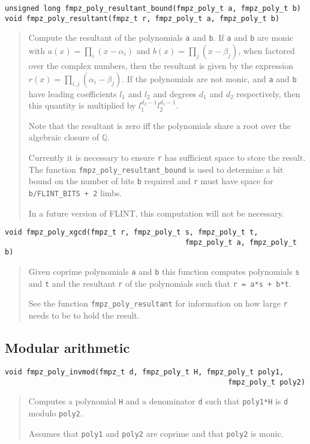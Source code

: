 \documentclass[a4paper,10pt]{article}
\newcommand{\Q}{\mathbb{Q}}
\newcommand{\code}{\lstinline}
\begin{document}
\begin{lstlisting}
unsigned long fmpz_poly_resultant_bound(fmpz_poly_t a, fmpz_poly_t b)
void fmpz_poly_resultant(fmpz_t r, fmpz_poly_t a, fmpz_poly_t b)
\end{lstlisting}
\begin{quote}
Compute the resultant of the polynomials \code{a} and \code{b}. If \code{a} and \code{b} are monic with $a(x) = \prod_i (x - \alpha_i)$ and $b(x) = \prod_j (x - \beta_j)$, when factored over the complex numbers, then the resultant is given by the expression $r(x) = \prod_{i,j} (\alpha_i - \beta_j)$. If the polynomials are not monic, and \code{a} and \code{b} have leading coefficients $l_1$ and $l_2$ and degrees $d_1$ and $d_2$ respectively, then this quantity is multiplied by $l_1^{d_2-1}l_2^{d_1-1}$.

Note that the resultant is zero iff the polynomials share a root over the algebraic closure of $\Q$.

Currently it is necessary to ensure \code{r} has sufficient space to store the result. The function \code{fmpz_poly_resultant_bound} is used to determine a bit bound on the number of bits \code{b} required and \code{r} must have space for \code{b/FLINT_BITS + 2} limbs.

In a future version of FLINT, this computation will not be necessary.
\end{quote}

\begin{lstlisting}
void fmpz_poly_xgcd(fmpz_t r, fmpz_poly_t s, fmpz_poly_t t, 
                                          fmpz_poly_t a, fmpz_poly_t b)
\end{lstlisting}
\begin{quote}
Given coprime polynomials \code{a} and \code{b} this function computes polynomials \code{s} and \code{t} and the resultant \code{r} of the polynomials such that \code{r = a*s + b*t}.

See the function \code{fmpz_poly_resultant} for information on how large \code{r} needs to be to hold the result.
\end{quote}

\subsection{Modular arithmetic}
\begin{lstlisting}
void fmpz_poly_invmod(fmpz_t d, fmpz_poly_t H, fmpz_poly_t poly1, 
                                                    fmpz_poly_t poly2)
\end{lstlisting}
\begin{quote}
Computes a polynomial \code{H} and a denominator \code{d} such that \code{poly1*H} is \code{d} modulo \code{poly2}. 

Assumes that \code{poly1} and \code{poly2} are coprime and that \code{poly2} is monic.
\end{quote}
\end{document}
